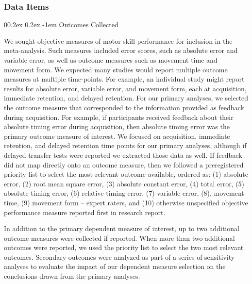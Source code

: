 \documentclass[
  english,
  man, donotrepeattitle,mask,floatsintext]{apa7}
\makeatletter
\let\oldparagraph\paragraph
\renewcommand{\paragraph}[1]{\oldparagraph{#1}\mbox{}}
\renewcommand{\paragraph}{\@startsection{paragraph}{4}{\parindent}%
  {0\baselineskip \@plus 0.2ex \@minus 0.2ex}%
  {-1em}%
  {\normalfont\normalsize\bfseries\itshape\typesectitle}}
\makeatother
\begin{document}
\hypertarget{data-items}{%
\subsubsection{Data Items}\label{data-items}}

\hypertarget{outcomes-collected}{%
\paragraph{Outcomes Collected}\label{outcomes-collected}}

We sought objective measures of motor skill performance for inclusion in the meta-analysis. Such measures included error scores, such as absolute error and variable error, as well as outcome measures such as movement time and movement form. We expected many studies would report multiple outcome measures at multiple time-points. For example, an individual study might report results for absolute error, variable error, and movement form, each at acquisition, immediate retention, and delayed retention. For our primary analyses, we selected the outcome measure that corresponded to the information provided as feedback during acquisition. For example, if participants received feedback about their absolute timing error during acquisition, then absolute timing error was the primary outcome measure of interest. We focused on acquisition, immediate retention, and delayed retention time points for our primary analyses, although if delayed transfer tests were reported we extracted those data as well. If feedback did not map directly onto an outcome measure, then we followed a preregistered priority list to select the most relevant outcome available, ordered as: (1) absolute error, (2) root mean square error, (3) absolute constant error, (4) total error, (5) absolute timing error, (6) relative timing error, (7) variable error, (8), movement time, (9) movement form -- expert raters, and (10) otherwise unspecified objective performance measure reported first in research report.

In addition to the primary dependent measure of interest, up to two additional outcome measures were collected if reported. When more than two additional outcomes were reported, we used the priority list to select the two most relevant outcomes. Secondary outcomes were analyzed as part of a series of sensitivity analyses to evaluate the impact of our dependent measure selection on the conclusions drawn from the primary analyses.
\end{document}
